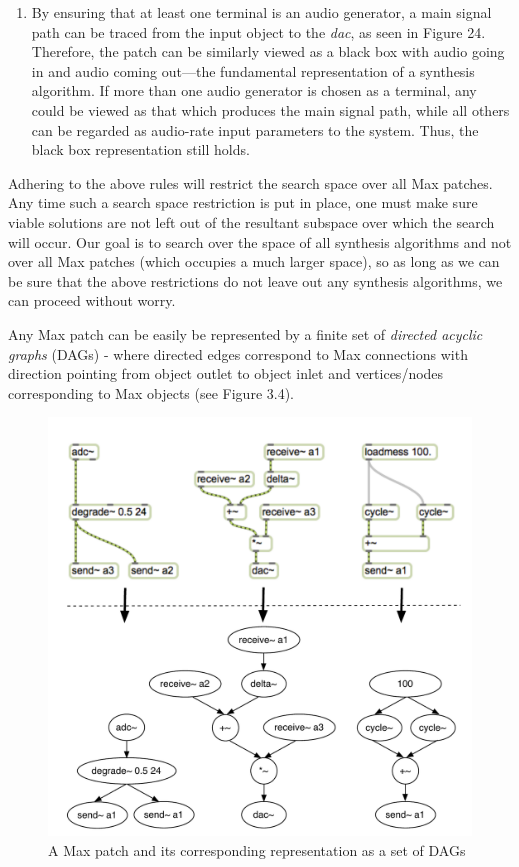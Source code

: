 \documentclass[12pt]{report} 	%
\numberwithin{figure}{chapter}
\numberwithin{table}{chapter}
\numberwithin{equation}{chapter}
\begin{document}
\begin{flushleft}
\begin{enumerate}
\item By ensuring that at least one terminal is an audio generator, a main signal path can be traced from the input object to the \textit{dac\texttildelow{}}, as seen in Figure 24. Therefore, the patch can be similarly viewed as a black box with audio going in and audio coming out---the fundamental representation of a synthesis algorithm. If more than one audio generator is chosen as a terminal, any could be viewed as that which produces the main signal path, while all others can be regarded as audio-rate input parameters to the system. Thus, the black box representation still holds.
\end{enumerate}

Adhering to the above rules will restrict the search space over all Max patches. Any time such a search space restriction is put in place, one must make sure viable solutions are not left out of the resultant subspace over which the search will occur. Our goal is to search over the space of all synthesis algorithms and not over all Max patches (which occupies a much larger space), so as long as we can be sure that the above restrictions do not leave out any synthesis algorithms, we can proceed without worry.

Any Max patch can be easily be represented by a finite set of \textit{directed acyclic graphs} (DAGs) - where directed edges correspond to Max connections with direction pointing from object outlet to object inlet and vertices/nodes corresponding to Max objects (see Figure 3.4).
\begin{figure}[h!]
\begin{center}
\includegraphics[scale=0.7]{MaxDAGs}
\caption[A Max patch as a set of DAGs]{A Max patch and its corresponding representation as a set of DAGs}
\end{center}
\end{figure}


\end{flushleft}
\end{document}
